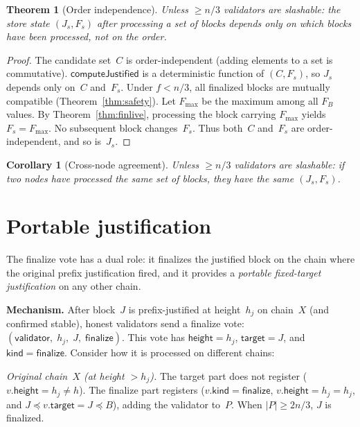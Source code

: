 \documentclass{article}
\renewcommand{\paragraph}[1]{\vspace{7pt}\noindent\textbf{#1}}
\newcommand{\target}{\mathsf{target}}
\newcommand{\kind}{\mathsf{kind}}
\newcommand{\height}{\mathsf{height}}
\newcommand{\finalize}{\mathsf{finalize}}
\newcommand{\validator}{\mathsf{validator}}
\theoremstyle{plain}
\newtheorem{theorem}{Theorem}
\newtheorem{corollary}{Corollary}
\theoremstyle{definition}
\theoremstyle{remark}
\begin{document}
\begin{theorem}[Order independence]\label{thm:orderindep}
Unless $\geq n/3$ validators are slashable: the store state $(J_s, F_s)$ after processing a set of blocks depends only on \emph{which} blocks have been processed, not on the order.
\end{theorem}

\begin{proof}
The candidate set~$C$ is order-independent (adding elements to a set is commutative).
$\textsf{computeJustified}$ is a deterministic function of $(C, F_s)$, so $J_s$ depends only on~$C$ and~$F_s$.
Under $f < n/3$, all finalized blocks are mutually compatible (Theorem~\ref{thm:safety}).
Let $F_{\max}$ be the maximum among all $F_B$ values.
By Theorem~\ref{thm:finlive}, processing the block carrying $F_{\max}$ yields $F_s = F_{\max}$.
No subsequent block changes~$F_s$.
Thus both~$C$ and~$F_s$ are order-independent, and so is~$J_s$.
\end{proof}

\begin{corollary}[Cross-node agreement]\label{cor:agreement}
Unless $\geq n/3$ validators are slashable: if two nodes have processed the same set of blocks, they have the same $(J_s, F_s)$.
\end{corollary}


\section{Portable justification}\label{sec:portable}

The finalize vote has a dual role: it finalizes the justified block on the chain where the original prefix justification fired, and it provides a \emph{portable fixed-target justification} on any other chain.

\paragraph{Mechanism.}
After block~$J$ is prefix-justified at height~$h_j$ on chain~$X$ (and confirmed stable), honest validators send a finalize vote: $(\validator,\; h_j,\; J,\; \finalize)$.
This vote has $\height = h_j$, $\target = J$, and $\kind = \finalize$.
Consider how it is processed on different chains:

\emph{Original chain~$X$ (at height $> h_j$).}
The target part does not register ($v.\height = h_j \neq h$).
The finalize part registers ($v.\kind = \finalize$, $v.\height = h_j = h_j$, and $J \preceq v.\target = J \preceq B$), adding the validator to~$P$.
When $|P| \geq 2n/3$, $J$ is finalized.
\end{document}
